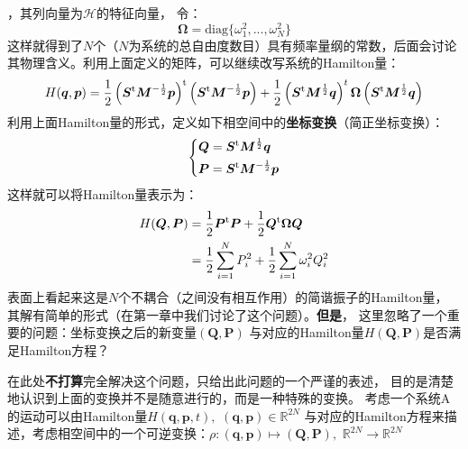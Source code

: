     ，其列向量为$\bm{\mathcal{H}}$的特征向量，
    令：
    \begin{equation}
        \bm{\Omega} = \mathrm{diag} \{\omega_1^2, ..., \omega_N^2 \}
    \end{equation}
    这样就得到了$N$个（$N$为系统的总自由度数目）具有频率量纲的常数，后面会讨论
    其物理含义。利用上面定义的矩阵，可以继续改写系统的Hamilton量：
    \begin{equation}
        H(\bm{q},\bm{p}) = \frac{1}{2}\left(\bm{S}^{\mathrm{t}}\bm{M}^{-\frac{1}{2}}\bm{p}\right)^{\mathrm{t}}\left(\bm{S}^{\mathrm{t}}\bm{M}^{-\frac{1}{2}}\bm{p}\right) + 
        \frac{1}{2}\left(\bm{S}^{\mathrm{t}}\bm{M}^{\frac{1}{2}}\bm{q}\right)^{t}\bm{\Omega}\left(\bm{S}^{\mathrm{t}}\bm{M}^{\frac{1}{2}}\bm{q}\right)
    \end{equation}
    利用上面Hamilton量的形式，定义如下相空间中的\textbf{坐标变换}（简正坐标变换）：
    \begin{equation}
        \left\{
        \begin{split}
            \bm{Q} &= \bm{S}^{\mathrm{t}}\bm{M}^{\frac{1}{2}}\bm{q}\\
            \bm{P} &= \bm{S}^{\mathrm{t}}\bm{M}^{-\frac{1}{2}}\bm{p}
        \end{split}
        \right.
        \label{normal mode transformation}
    \end{equation}
    这样就可以将Hamilton量表示为：
    \begin{equation}
        \begin{split}
        H(\bm{Q},\bm{P}) &= \frac{1}{2}\bm{P}^{\mathrm{t}}\bm{P} + \frac{1}{2}\bm{Q}^{\mathrm{t}}\bm{\Omega}\bm{Q}\\
        & = \frac{1}{2}\sum_{i=1}^{N}P_{i}^2 + \frac{1}{2}\sum_{i=1}^{N}\omega_{i}^2Q_{i}^{2}
        \end{split}
    \end{equation}
    表面上看起来这是$N$个不耦合（之间没有相互作用）的简谐振子的Hamilton量，
    其解有简单的形式（在第一章中我们讨论了这个问题）。\textbf{但是}，
    这里忽略了一个重要的问题：坐标变换之后的新变量$(\bm{Q},\bm{P})$
    与对应的Hamilton量$H(\bm{Q},\bm{P})$是否满足Hamilton方程？
    \par 
    在此处\textbf{不打算}完全解决这个问题，只给出此问题的一个严谨的表述，
    目的是清楚地认识到上面的变换并不是随意进行的，而是一种特殊的变换。
    考虑一个系统A的运动可以由Hamilton量$H(\bm{q},\bm{p},t),\,\,(\bm{q},\bm{p})\in\mathbb{R}^{2N}$
    与对应的Hamilton方程来描述，考虑相空间中的一个可逆变换：$\rho:(\bm{q},\bm{p})\mapsto(\bm{Q}, \bm{P}),\,\,\mathbb{R}^{2N}\to\mathbb{R}^{2N}$
